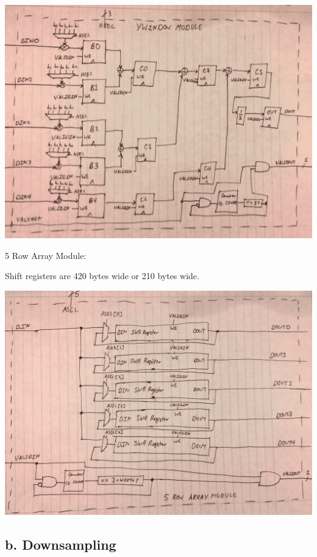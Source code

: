 \documentclass[11pt]{article}
\begin{document}
\noindent\includegraphics[width=\textwidth]{modules/procy_window.png}

\newpage

5 Row Array Module:

Shift registers are 420 bytes wide or 210 bytes wide. \newline

\noindent\includegraphics[width=\textwidth]{modules/proc5row.png}

\newpage

\subsection*{b. Downsampling}
\end{document}
